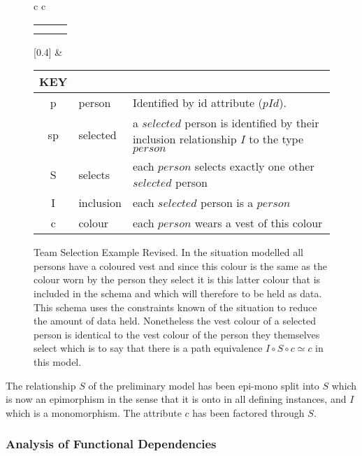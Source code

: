 \begin{figure} [h]
\begin{center}
\begin{tabular}{c c}
\begin{tabular}{c p{1.5cm} c}
   \Rnode{sp}{sp} & &           \\[1.4cm]
   \Rnode{p}{p}   & & \Rnode{v}{v}
\end{tabular}
\idcomp
{}
[0.4]
\idcomp 
& \footnotesize
\begin{tabular}{c p{1.5cm} p{4cm}}
KEY && \\
\hline
p & person & Identified by id attribute ($pId$). \\
sp & selected & a $selected$ person is identified by their inclusion relationship $I$ to the type $person$ \\
S & selects & each $person$ selects exactly one other $selected$ person \\
I & inclusion & each $selected$ person is a $person$ \\
c & colour & each $person$ wears a vest of this colour 
\end{tabular} 
\end{tabular}
\end{center}
\caption{Team Selection Example Revised. 
In the situation modelled all persons have a coloured vest and since this colour is the same as the colour 
worn by the person they select it is this latter colour that is included in the schema and which will therefore to be held as data. 
This schema uses the constraints known of the situation to reduce the amount of data held.
Nonetheless the  vest colour  of a selected person is 
identical to the vest colour of the person they themselves select which is to say that there is a  path equivalence $I \circ S \circ c \simeq c$ in this model.
}
\label{teamselectionrevisedERschema}
\end{figure}

\begin{categoricalaside}

The relationship $S$ of the preliminary model has been epi-mono split into $S$ which is now an epimorphism in the sense that it is onto in all defining instances,
and $I$ which is a monomorphism. The attribute $c$ has been factored through $S$.
\end{categoricalaside}

\subsubsection{Analysis of Functional Dependencies}
 
